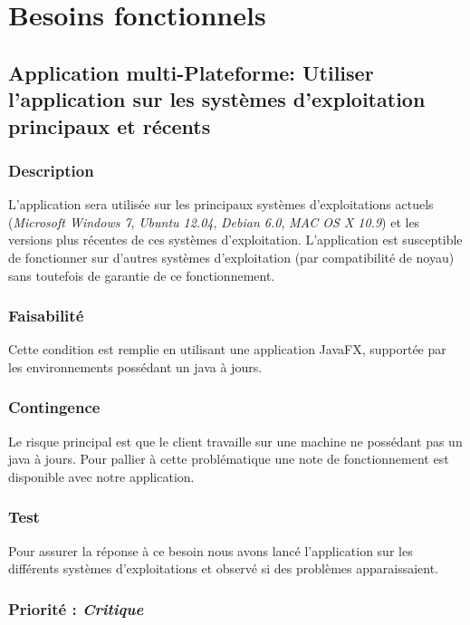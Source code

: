 \section{Besoins fonctionnels}\label{besoins_fonctionnels}

\subsection{Application multi-Plateforme: Utiliser l’application sur les systèmes d’exploitation principaux et récents}\label{systems}

\subsubsection{Description}

L’application sera utilisée sur les principaux systèmes d’exploitations actuels (\textit{Microsoft Windows 7}, \textit{Ubuntu 12.04}, \textit{Debian 6.0}, \textit{MAC OS X 10.9}) et les versions plus récentes de ces systèmes d’exploitation.
L’application est susceptible de fonctionner sur d’autres systèmes d’exploitation (par compatibilité de noyau) sans toutefois de garantie de ce fonctionnement.

\subsubsection{Faisabilité}

Cette condition est remplie en utilisant une application JavaFX, supportée par les environnements possédant un java à jours.

\subsubsection{Contingence}

Le risque principal est que le client travaille sur une machine ne possédant pas un java à jours. Pour pallier à cette problématique une note de fonctionnement est disponible avec notre application.

\subsubsection{Test}

Pour assurer la réponse à ce besoin nous avons lancé l’application sur les différents systèmes d’exploitations et observé si des problèmes apparaissaient.

\subsubsection{Priorité : \textit{Critique}}

